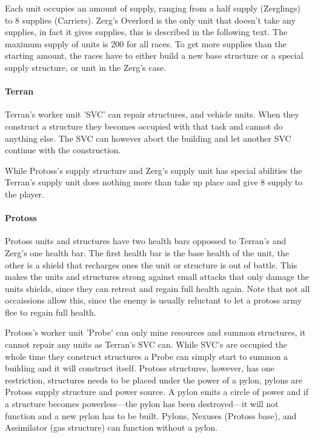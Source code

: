 Each unit occupies an amount of supply, ranging from a half supply (Zerglings) to 8 supplies (Carriers). Zerg's Overlord is the only unit that doesn't take any supplies, in fact it gives supplies, this is described in the following text. The maximum supply of units is 200 for all races. To get more supplies than the starting amount, the races have to either build a new base structure or a special supply structure, or unit in the Zerg's case.

\paragraph{Terran}
Terran's worker unit 'SVC' can repair structures, and vehicle units. When they construct a structure they becomes occupied with that task and cannot do anything else. The SVC can however abort the building and let another SVC continue with the construction.

While Protoss's supply structure and Zerg's supply unit has special abilities the Terran's supply unit does nothing more than take up place and give 8 supply to the player.

\paragraph{Protoss}
Protoss units and structures have two health bars oppossed to Terran's and Zerg's one health bar. The first health bar is the base health of the unit, the other is a shield that recharges ones the unit or structure is out of battle. This makes the units and structures strong against small attacks that only damage the units shields, since they can retreat and regain full health again. Note that not all occaissions allow this, since the enemy is usually reluctant to let a protoss army flee to regain full health.

Protoss's worker unit 'Probe' can only mine resources and summon structures, it cannot repair any units as Terran's SVC can. While SVC's are occupied the whole time they construct structures a Probe can simply start to summon a building and it will construct itself. Protoss structures, however, has one restriction, structures needs to be placed under the power of a pylon, pylons are Protoss supply structure and power source. A pylon emits a circle of power and if a structure becomes powerless—the pylon has been destroyed—it will not function and a new pylon has to be built. Pylons, Nexuses (Protoss base), and Assimilator (gas structure) can function without a pylon.


